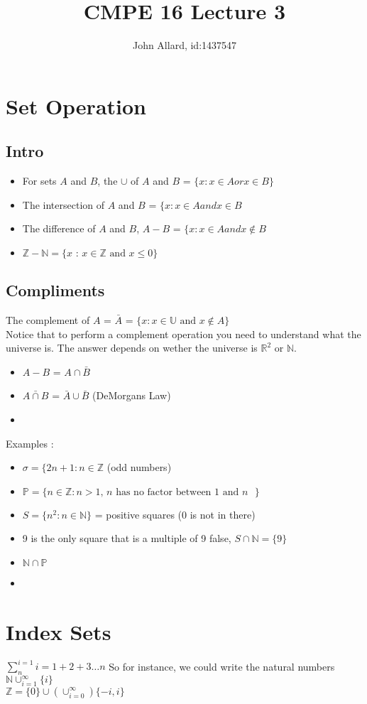 \documentclass[a4paper,11pt]{article}
\title{ CMPE 16 Lecture 3}
\author{John Allard, id:1437547}
\begin{document}
\maketitle
\section{Set Operation}
\subsection{Intro}
\begin{itemize}
\item For sets  $A$ and $B$, the $\cup$ of $A$ and $B$ =  $\lbrace	x : x \in A or  x \in B \rbrace$  
\item The intersection of $A$ and $B$ = $\lbrace x : x\in A and x \in B$ 
\item The difference of $A$ and $B$, $A-B$ = $\lbrace x : x \in A and x \not\in B$ 
\item $\mathbb{Z}-\mathbb{N} = \lbrace x\text{ : }x \in \mathbb{Z} \text{ and } x \leq 0 \rbrace$
\end{itemize}

\subsection{Compliments}
The complement of $A$ = $\bar{A}$ = $ \lbrace x : x \in \mathbb{U} \text{ and } x \not\in A \rbrace $ \\
Notice that to perform a complement operation you need to understand what the universe is. The answer depends on wether the universe is $\mathbb{R}^2$ or $\mathbb{N}$. 
\begin{itemize}
\item $A-B$ = $A \cap \bar{B}$
\item $\bar{A \cap B}$ = $\bar{A} \cup \bar{B}$ (DeMorgans Law) 
\item 
\end{itemize}

Examples :
\begin{itemize}
\item $\sigma = \lbrace 2n+1 : n \in \mathbb{Z}$ (odd numbers)
\item $\mathbb{P} = \lbrace n \in \mathbb{Z} : n > 1 \text{, $n$ has no factor between 1 and  $n$ }\rbrace $
\item $ S = \lbrace n^2 : n \in \mathbb{N} \rbrace $ = positive squares (0 is not in there)
\item 9 is the only square that is a multiple of 9 false,  $S \cap \mathbb{N} = \lbrace 9 \rbrace $
\item $ \mathbb{N} \cap \mathbb{P} $
\item 
\end{itemize}


\section{Index Sets}
$\sum_{n}^{i=1} i = 1+2+3 \ldots n$
So for instance, we could write the natural numbers $\mathbb{N} \cup_{i=1}^{\infty} \lbrace i \rbrace $ \\
$ \mathbb{Z} = \lbrace 0 \rbrace \cup ( \cup_{i=0}^{\infty}) \lbrace-i, i\rbrace $
\end{document}
